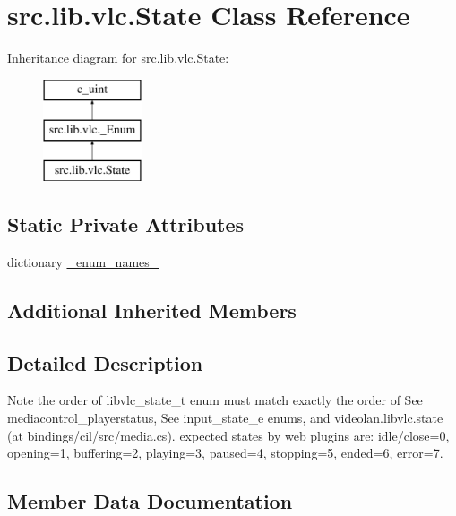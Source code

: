 \hypertarget{classsrc_1_1lib_1_1vlc_1_1State}{}\section{src.\+lib.\+vlc.\+State Class Reference}
\label{classsrc_1_1lib_1_1vlc_1_1State}
Inheritance diagram for src.\+lib.\+vlc.\+State\+:\begin{figure}[H]
\begin{center}
\leavevmode
\includegraphics[height=3.000000cm]{classsrc_1_1lib_1_1vlc_1_1State}
\end{center}
\end{figure}
\subsection*{Static Private Attributes}
\begin{DoxyCompactItemize}
\item 
dictionary \hyperlink{classsrc_1_1lib_1_1vlc_1_1State_a3e2fd195ae0b293c4ed0dd8ecc5d229f}{\+\_\+enum\+\_\+names\+\_\+}
\end{DoxyCompactItemize}
\subsection*{Additional Inherited Members}


\subsection{Detailed Description}
\begin{DoxyVerb}Note the order of libvlc_state_t enum must match exactly the order of
See mediacontrol_playerstatus, See input_state_e enums,
and videolan.libvlc.state (at bindings/cil/src/media.cs).
expected states by web plugins are:
idle/close=0, opening=1, buffering=2, playing=3, paused=4,
stopping=5, ended=6, error=7.
\end{DoxyVerb}
 

\subsection{Member Data Documentation}
\hypertarget{classsrc_1_1lib_1_1vlc_1_1State_a3e2fd195ae0b293c4ed0dd8ecc5d229f}{}
